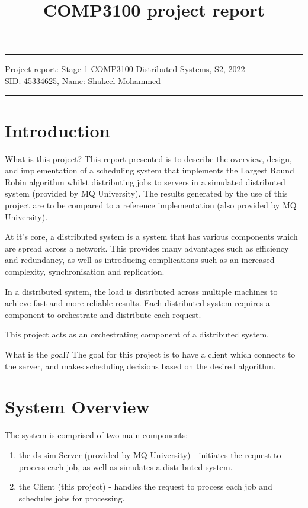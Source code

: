 \documentclass[a4paper]{article}
\begin{document}
\title{COMP3100 project report}
\hrule \medskip %
\begin{minipage}{1\textwidth}
\centering 
\large %
Project report: Stage 1
COMP3100 Distributed Systems, S2, 2022\\
\normalsize %
SID: 45334625, Name: Shakeel Mohammed
\end{minipage}
\medskip\hrule %
\bigskip

\section{Introduction}
What is this project?
This report presented is to describe the overview, design, and implementation of a scheduling system that implements the Largest Round Robin algorithm whilst distributing jobs to servers in a simulated distributed system (provided by MQ University). The results generated by the use of this project are to be compared to a reference implementation (also provided by MQ University).

At it's core, a distributed system is a system that has various components which are spread across a network. This provides many advantages such as efficiency and redundancy, as well as introducing complications such as an increased complexity, synchronisation and replication.

In a distributed system, the load is distributed across multiple machines to achieve fast and more reliable results. Each distributed system requires a component to orchestrate and distribute each request.

This project acts as an orchestrating component of a distributed system.

What is the goal?
The goal for this project is to have a client which connects to the server, and makes scheduling decisions based on the desired algorithm.

\section{System Overview}
\label{sec:section2}
The system is comprised of two main components:
\begin{enumerate}
  \item the ds-sim Server (provided by MQ University) - initiates the request to process each job, as well as simulates a distributed system.
  \item the Client (this project) - handles the request to process each job and schedules jobs for processing.
\end{enumerate}
\end{document}
